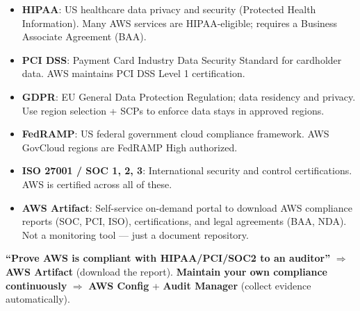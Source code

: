 

\begin{keyfacts}
\begin{itemize}
  \item \textbf{HIPAA}: US healthcare data privacy and security (Protected Health Information).
        Many AWS services are HIPAA-eligible; requires a Business Associate Agreement (BAA).
  \item \textbf{PCI DSS}: Payment Card Industry Data Security Standard for cardholder data.
        AWS maintains PCI DSS Level 1 certification.
  \item \textbf{GDPR}: EU General Data Protection Regulation; data residency and privacy.
        Use region selection + SCPs to enforce data stays in approved regions.
  \item \textbf{FedRAMP}: US federal government cloud compliance framework.
        AWS GovCloud regions are FedRAMP High authorized.
  \item \textbf{ISO 27001 / SOC 1, 2, 3}: International security and control certifications.
        AWS is certified across all of these.
  \item \textbf{AWS Artifact}: Self-service on-demand portal to download AWS compliance
        reports (SOC, PCI, ISO), certifications, and legal agreements (BAA, NDA).
        Not a monitoring tool --- just a document repository.
\end{itemize}
\end{keyfacts}

\begin{examtip}
\textbf{``Prove AWS is compliant with HIPAA/PCI/SOC2 to an auditor''} $\Rightarrow$ \textbf{AWS Artifact}
(download the report). \textbf{Maintain your own compliance continuously} $\Rightarrow$ \textbf{AWS Config}
+ \textbf{Audit Manager} (collect evidence automatically).
\end{examtip}
